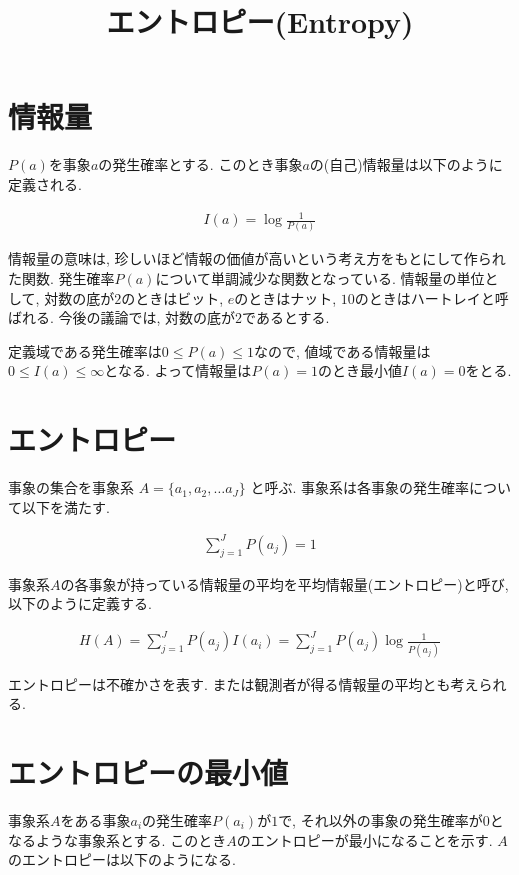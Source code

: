 \documentclass[dvipdfmx, 10pt]{jsarticle}
\title{\textbf{エントロピー(Entropy)}}
\author{}
\date{}
\begin{document}
\maketitle

\section*{情報量}
\(P(a)\)を事象\(a\)の発生確率とする. このとき事象\(a\)の(自己)情報量は以下のように定義される. 

\begin{align*}
    I(a) = \log \frac{1}{P(a)}
\end{align*}

情報量の意味は, 珍しいほど情報の価値が高いという考え方をもとにして作られた関数. 
発生確率\(P(a)\)について単調減少な関数となっている. 
情報量の単位として, 対数の底が\(2\)のときはビット, \(e\)のときはナット, \(10\)のときはハートレイと呼ばれる. 
今後の議論では, 対数の底が\(2\)であるとする. 

定義域である発生確率は\(0 \leq P(a) \leq 1\)なので, 値域である情報量は\(0 \leq I(a) \leq \infty\)となる. 
よって情報量は\(P(a) = 1\)のとき最小値\(I(a) = 0\)をとる. 

\section*{エントロピー}
事象の集合を事象系 \(A = \{a_1, a_2, \dots a_J\}\) と呼ぶ. 事象系は各事象の発生確率について以下を満たす. 

\begin{align*}
    \sum_{j=1}^{J} P(a_j) = 1
\end{align*}

事象系\(A\)の各事象が持っている情報量の平均を平均情報量(エントロピー)と呼び, 以下のように定義する. 

\begin{align*}
    H(A) = \sum_{j=1}^{J} P(a_j) I(a_i) = \sum_{j=1}^{J} P(a_j) \log \frac{1}{P(a_j)}
\end{align*}

エントロピーは不確かさを表す. または観測者が得る情報量の平均とも考えられる. 

\section*{エントロピーの最小値}
事象系\(A\)をある事象\(a_i\)の発生確率\(P(a_i)\)が\(1\)で, それ以外の事象の発生確率が\(0\)となるような事象系とする. 
このとき\(A\)のエントロピーが最小になることを示す. \(A\)のエントロピーは以下のようになる. 
\end{document}
